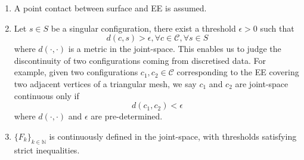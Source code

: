 \documentclass[conference]{IEEEtran}
\begin{document}
\begin{enumerate}
\item A point contact between surface and EE is assumed. 
\item 

Let $s\in S$ be a singular configuration, there exist a threshold $\epsilon > 0$ such that 
\begin{equation}
d(c, s) > \epsilon, \forall c\in \mathscr{C}, \forall s\in S
\end{equation}
where $d(\cdot, \cdot)$ is a metric in the joint-space. This enables us to judge the discontinuity of two configurations coming from discretised data. 
For example, given two configurations $c_1, c_2\in \mathscr{C}$ corresponding to the EE covering two adjacent vertices of a triangular mesh, we say $c_1$ and $c_2$ are joint-space continuous only if 
\begin{equation}
d(c_1, c_2) < \epsilon
\end{equation}
where $d(\cdot, \cdot)$ and $\epsilon$ are pre-determined. 
\item $\{F_k\}_{k\in \mathbb{N}}$ is continuously defined in the joint-space, with thresholds satisfying strict inequalities. 

\end{enumerate}
\end{document}
